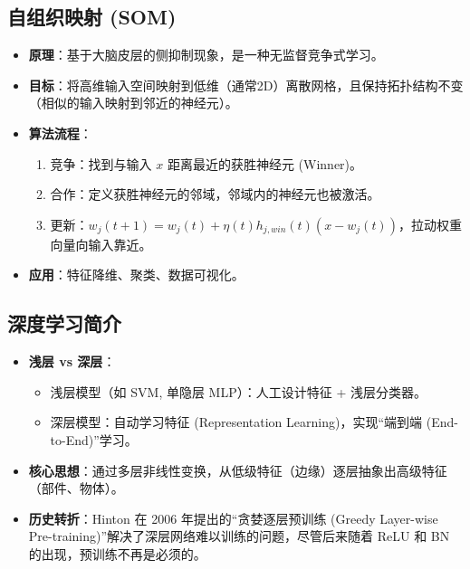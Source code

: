 \documentclass[a4paper, 11pt]{ctexart}
\begin{document}
\subsection{自组织映射 (SOM)}
\begin{itemize}
    \item \textbf{原理}：基于大脑皮层的侧抑制现象，是一种无监督竞争式学习。
    \item \textbf{目标}：将高维输入空间映射到低维（通常2D）离散网格，且保持拓扑结构不变（相似的输入映射到邻近的神经元）。
    \item \textbf{算法流程}：
    \begin{enumerate}
        \item 竞争：找到与输入 $x$ 距离最近的获胜神经元 (Winner)。
        \item 合作：定义获胜神经元的邻域，邻域内的神经元也被激活。
        \item 更新：$w_j(t+1) = w_j(t) + \eta(t) h_{j,win}(t) (x - w_j(t))$，拉动权重向量向输入靠近。
    \end{enumerate}
    \item \textbf{应用}：特征降维、聚类、数据可视化。
\end{itemize}

\subsection{深度学习简介}
\begin{itemize}
    \item \textbf{浅层 vs 深层}：
    \begin{itemize}
        \item 浅层模型（如 SVM, 单隐层 MLP）：人工设计特征 + 浅层分类器。
        \item 深层模型：自动学习特征 (Representation Learning)，实现“端到端 (End-to-End)”学习。
    \end{itemize}
    \item \textbf{核心思想}：通过多层非线性变换，从低级特征（边缘）逐层抽象出高级特征（部件、物体）。
    \item \textbf{历史转折}：Hinton 在 2006 年提出的“贪婪逐层预训练 (Greedy Layer-wise Pre-training)”解决了深层网络难以训练的问题，尽管后来随着 ReLU 和 BN 的出现，预训练不再是必须的。
\end{itemize}
\end{document}
